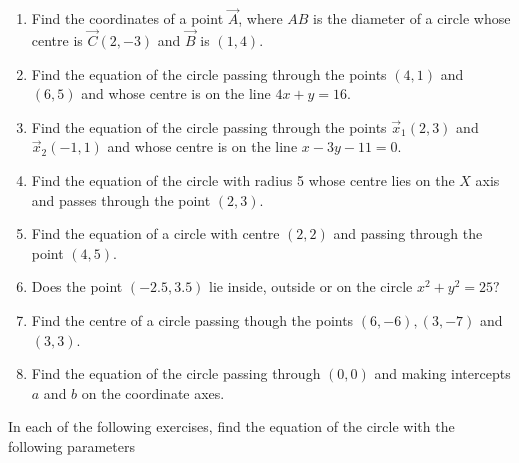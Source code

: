 \begin{enumerate}[label=\thesubsection.\arabic*, ref=\thesubsection.\theenumi]
\item Find the coordinates of a point $\vec{A}$, where $AB$ is the diameter of a circle whose centre is $ \vec{C}(2,-3)$  and  $\vec{B}$ is $(1,4)$.
	\\
		\solution
	
  \item Find the equation of the circle passing through the points $(4, 1)$ and $(6, 5)$ and whose centre is on the line $ 4x+y=16. $
\label{chapters/11/11/1/10}
\\
\solution

  \item Find the equation of the circle passing through the points $\vec{x}_1(2, 3)$ and $\vec{x}_2(-1, 1)$ and whose centre is on the line $x-3y-11=0$.
\label{chapters/11/11/1/11}
\\
\solution 

  \item Find the equation of the circle with radius 5 whose centre lies on the $X$ axis and passes through the point $(2, 3)$.
\label{chapters/11/11/1/12}
\\
\solution 

  \item Find the equation of a circle with centre $(2, 2)$ and passing through the point $(4, 5)$.
\label{chapters/11/11/1/14}
\\
\solution

  \item Does the point $(-2.5, 3.5)$ lie inside,  outside or on the circle $x^{2}+y^{2}=25?$
\\
\solution

\item Find the centre of a circle passing though the points $(6, -6),  (3, -7)$ and $(3, 3)$. \\ 
\label{chapters/10/7/4/3}
\solution 

  \item Find the equation of the circle passing through $(0, 0)$ and making intercepts $a$ and $b$ on the coordinate axes.
\end{enumerate}
In each of the following exercises,  find the equation of the circle with the following parameters
